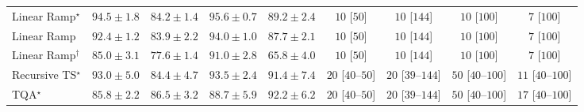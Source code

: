 \begin{tabular}{l|cccc|cccc|}
Linear Ramp$^\star$ & {\cellcolor[HTML]{6C0968}} \color[HTML]{F1F1F1} $94.5\pm 1.8$ & {\cellcolor[HTML]{8A51A5}} \color[HTML]{F1F1F1} $84.2\pm 1.4$ & {\cellcolor[HTML]{62065F}} \color[HTML]{F1F1F1} $95.6\pm 0.7$ & {\cellcolor[HTML]{85288D}} \color[HTML]{F1F1F1} $89.2\pm 2.4$ & {\cellcolor[HTML]{FFF7F3}} \color[HTML]{000000} $10$ [$50$] & {\cellcolor[HTML]{FFF7F3}} \color[HTML]{000000} $10$ [$144$] & {\cellcolor[HTML]{FFF7F3}} \color[HTML]{000000} $10$ [$100$] & {\cellcolor[HTML]{FFF7F3}} \color[HTML]{000000} $7$ [$100$] \\
Linear Ramp & {\cellcolor[HTML]{800F7B}} \color[HTML]{F1F1F1} $92.4\pm 1.2$ & {\cellcolor[HTML]{8A54A6}} \color[HTML]{F1F1F1} $83.9\pm 2.2$ & {\cellcolor[HTML]{710A6D}} \color[HTML]{F1F1F1} $94.0\pm 1.0$ & {\cellcolor[HTML]{873696}} \color[HTML]{F1F1F1} $87.7\pm 2.1$ & {\cellcolor[HTML]{FFF7F3}} \color[HTML]{000000} $10$ [$50$] & {\cellcolor[HTML]{FFF7F3}} \color[HTML]{000000} $10$ [$144$] & {\cellcolor[HTML]{FFF7F3}} \color[HTML]{000000} $10$ [$100$] & {\cellcolor[HTML]{FFF7F3}} \color[HTML]{000000} $7$ [$100$] \\
Linear Ramp$^\dagger$ & {\cellcolor[HTML]{894CA2}} \color[HTML]{F1F1F1} $85.0\pm 3.1$ & {\cellcolor[HTML]{8C82BC}} \color[HTML]{F1F1F1} $77.6\pm 1.4$ & {\cellcolor[HTML]{821982}} \color[HTML]{F1F1F1} $91.0\pm 2.8$ & {\cellcolor[HTML]{B1C9E1}} \color[HTML]{000000} $65.8\pm 4.0$ & {\cellcolor[HTML]{FFF7F3}} \color[HTML]{000000} $10$ [$50$] & {\cellcolor[HTML]{FFF7F3}} \color[HTML]{000000} $10$ [$144$] & {\cellcolor[HTML]{FFF7F3}} \color[HTML]{000000} $10$ [$100$] & {\cellcolor[HTML]{FFF7F3}} \color[HTML]{000000} $7$ [$100$] \\
Recursive TS$^\star$ & {\cellcolor[HTML]{790D75}} \color[HTML]{F1F1F1} $93.0\pm 5.0$ & {\cellcolor[HTML]{8950A4}} \color[HTML]{F1F1F1} $84.4\pm 4.7$ & {\cellcolor[HTML]{740B70}} \color[HTML]{F1F1F1} $93.5\pm 2.4$ & {\cellcolor[HTML]{821580}} \color[HTML]{F1F1F1} $91.4\pm 7.4$ & {\cellcolor[HTML]{FFF4F0}} \color[HTML]{000000} $20$ [$40$--$50$] & {\cellcolor[HTML]{FFF4F0}} \color[HTML]{000000} $20$ [$39$--$144$] & {\cellcolor[HTML]{FEEDE9}} \color[HTML]{000000} $50$ [$40$--$100$] & {\cellcolor[HTML]{FFF6F2}} \color[HTML]{000000} $11$ [$40$--$100$] \\
TQA$^\star$ & {\cellcolor[HTML]{88459F}} \color[HTML]{F1F1F1} $85.8\pm 2.2$ & {\cellcolor[HTML]{88409C}} \color[HTML]{F1F1F1} $86.5\pm 3.2$ & {\cellcolor[HTML]{852D90}} \color[HTML]{F1F1F1} $88.7\pm 5.9$ & {\cellcolor[HTML]{810F7C}} \color[HTML]{F1F1F1} $92.2\pm 6.2$ & {\cellcolor[HTML]{FFF4F0}} \color[HTML]{000000} $20$ [$40$--$50$] & {\cellcolor[HTML]{FFF4F0}} \color[HTML]{000000} $20$ [$39$--$144$] & {\cellcolor[HTML]{FEEDE9}} \color[HTML]{000000} $50$ [$40$--$100$] & {\cellcolor[HTML]{FFF5F1}} \color[HTML]{000000} $17$ [$40$--$100$] \\

\end{tabular}
